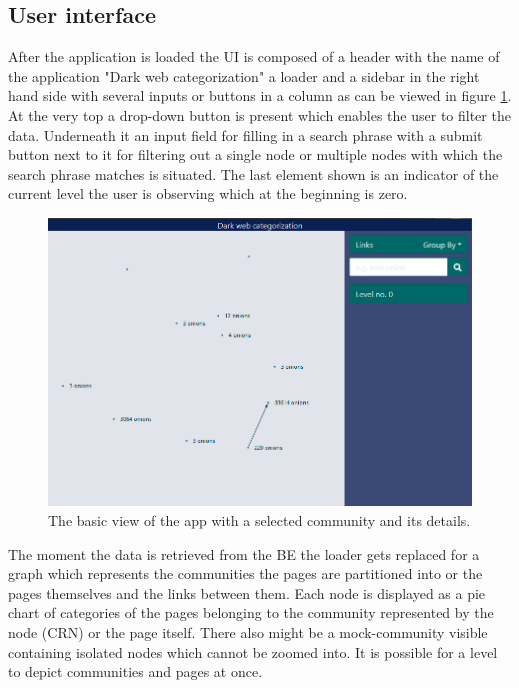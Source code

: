 \subsection{User interface}
After the application is loaded the UI is composed of a header with the name of the application "Dark web categorization" a loader and a sidebar in the right hand side with several inputs or buttons in a column as can be viewed in figure \ref{zeroLevelGraphBasic}. At the very top a drop-down button is present which enables the user to filter the data. Underneath it an input field for filling in a search phrase with a submit button next to it for filtering out a single node or multiple nodes with which the search phrase matches is situated. The last element shown is an indicator of the current level the user is observing which at the beginning is zero. 
\begin{figure}[ht!]
  \centering
  \includegraphics[width=\textwidth]{Images/ZeroLevelGraphBasic.png}
  \caption{The basic view of the app with a selected community and its details.}
  \label{zeroLevelGraphBasic}
\end{figure} 


The moment the data is retrieved from the BE the loader gets replaced for a graph which represents the communities the pages are partitioned into or the pages themselves and the links between them. Each node is displayed as a pie chart of categories of the pages belonging to the community represented by the node (CRN) or the page itself. There also might be a mock-community visible containing isolated nodes which cannot be zoomed into. It is possible for a level to depict communities and pages at once. 


